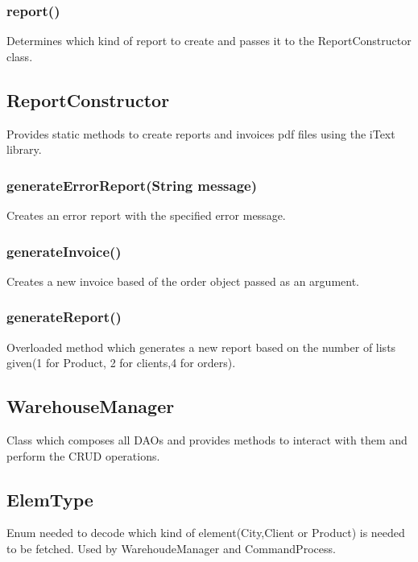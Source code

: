 \documentclass[10pt,a4paper]{article}
\begin{document}
\subsubsection{report()}
Determines which kind of report to create and passes it to the ReportConstructor class.

\subsection{ReportConstructor}
Provides static methods to create reports and invoices pdf files using the iText library.
\subsubsection{generateErrorReport(String message)}
Creates an error report with the specified error message.
\subsubsection{generateInvoice()}
Creates a new invoice based of the order object passed as an argument.
\subsubsection{generateReport()}
Overloaded method which generates a new report based on the number of lists given(1 for Product, 2 for clients,4 for orders).
\subsection{WarehouseManager}
Class which composes all DAOs and provides methods to interact with them and perform the CRUD operations.
\subsection{ElemType}
Enum needed to decode which kind of element(City,Client or Product) is needed to be fetched. Used by WarehoudeManager and CommandProcess.
\end{document}
